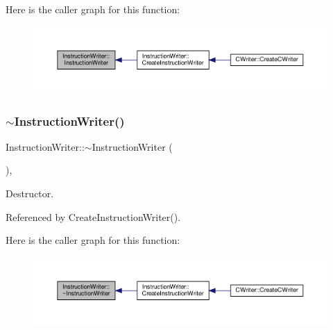 Here is the caller graph for this function\+:
\nopagebreak
\begin{figure}[H]
\begin{center}
\leavevmode
\includegraphics[width=350pt]{d3/d00/classInstructionWriter_ada26768a0d9c74b21b275f11fe4985e7_icgraph}
\end{center}
\end{figure}
\mbox{\label{classInstructionWriter_a682e5e34912c1c5e7b90f872d8a37f2b}} 
\subsubsection{\texorpdfstring{$\sim$\+Instruction\+Writer()}{~InstructionWriter()}}
{\footnotesize\ttfamily Instruction\+Writer\+::$\sim$\+Instruction\+Writer (\begin{DoxyParamCaption}{ }\end{DoxyParamCaption})\hspace{0.3cm}{\ttfamily [virtual]}, {\ttfamily [default]}}



Destructor. 



Referenced by Create\+Instruction\+Writer().

Here is the caller graph for this function\+:
\nopagebreak
\begin{figure}[H]
\begin{center}
\leavevmode
\includegraphics[width=350pt]{d3/d00/classInstructionWriter_a682e5e34912c1c5e7b90f872d8a37f2b_icgraph}
\end{center}
\end{figure}


